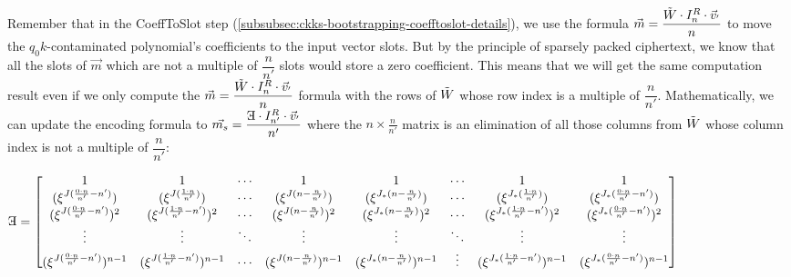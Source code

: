 Remember that in the \textsf{CoeffToSlot} step (\autoref{subsubsec:ckks-bootstrapping-coefftoslot-details}), we use the formula $\vec{m} = \dfrac{\tilde W \cdot I_n^R \cdot \vec{v}_{'}}{n}$ to move the $q_0k$-contaminated polynomial's coefficients to the input vector slots. But by the principle of sparsely packed ciphertext, we know that all the slots of $\vec{m}$ which are not a multiple of $\dfrac{n}{n'}$ slots would store a zero coefficient. This means that we will get the same computation result even if we only compute the $\vec{m} = \dfrac{\tilde W \cdot I_n^R \cdot \vec{v}_{'}}{n}$ formula with the rows of $\tilde W$ whose row index is a multiple of $\dfrac{n}{n'}$. Mathematically, we can update the encoding formula to $\vec{m_s} = \dfrac{ \text{\rotatecharone{E}} \cdot I_{n'}^R \cdot \vec{v}_{'}}{n'}$ where the $n \times \frac{n}{n'}$ matrix  is an elimination of all those columns from $\tilde W$ whose column index is not a multiple of $\dfrac{n}{n'}$:

{\footnotesize{\hspace{-1cm}\noindent $\text{\rotatecharone{E}} = \begin{bmatrix}
1 & 1 & \cdots & 1 & 1 & \cdots & 1 & 1\\
(\xi^{J(\frac{0\cdot n}{n'}-n')}) & (\xi^{J(\frac{1\cdot n}{n'})}) & \cdots & (\xi^{J(n-\frac{n}{n'})}) & (\xi^{J_*(n-\frac{n}{n'})}) & \cdots & (\xi^{J_*(\frac{1\cdot n}{n'})}) & (\xi^{J_*(\frac{0\cdot n}{n'}-n')})\\
(\xi^{J(\frac{0\cdot n}{n'}-n')})^2 & (\xi^{J(\frac{1\cdot n}{n'}-n')})^2 & \cdots & (\xi^{J(n-\frac{n}{n'})})^2 & (\xi^{J_*(n-\frac{n}{n'})})^2 & \cdots & (\xi^{J_*(\frac{1\cdot n}{n'}-n')})^2 & (\xi^{J_*(\frac{0\cdot n}{n'}-n')})^2 \\
\vdots & \vdots & \ddots & \vdots & \vdots & \ddots & \vdots & \vdots \\
(\xi^{J(\frac{0\cdot n}{n'}-n')})^{n-1} & (\xi^{J(\frac{1\cdot n}{n'}-n')})^{n-1} & \cdots & (\xi^{J(n-\frac{n}{n'})})^{n-1} & (\xi^{J_*(n-\frac{n}{n'})})^{n-1} & \vdots & (\xi^{J_*(\frac{1\cdot n}{n'}-n')})^{n-1} & (\xi^{J_*(\frac{0\cdot n}{n'}-n')})^{n-1} 
\end{bmatrix}$}}

$ $

